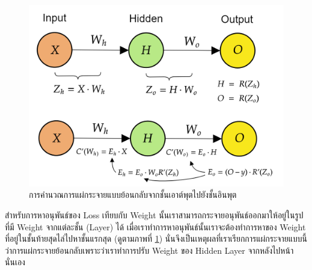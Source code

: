 \begin{figure}[H]
    \centering
    \includegraphics[width=0.55\linewidth]{fig/nn_backprop.png}
    \caption{การคำนวณการแผ่กระจายแบบย้อนกลับจากชั้นเอาต์พุตไปยังชั้นอินพุต}
    \label{fig:nn_bp}
\end{figure}

สำหรับการหาอนุพันธ์ของ Loss เทียบกับ Weight นั้นเราสามารถกระจายอนุพันธ์ออกมาให้อยู่ในรูปที่มี Weight จากแต่ละชั้น (Layer) ได้
เมื่อเราทำการหาอนุพันธ์นั้นเราจะต้องทำการหาของ Weight ที่อยู่ในชั้นท้ายสุดไล่ไปหาชั้นแรกสุด (ดูตามภาพที่ \ref{fig:nn_bp})
นั่นจึงเป็นเหตุผลที่เราเรียกการแผ่กระจายแบบนี้ว่าการแผ่กระจายย้อนกลับเพราะว่าเราทำการปรับ Weight ของ Hidden Layer จากหลังไปหน้านั่นเอง


